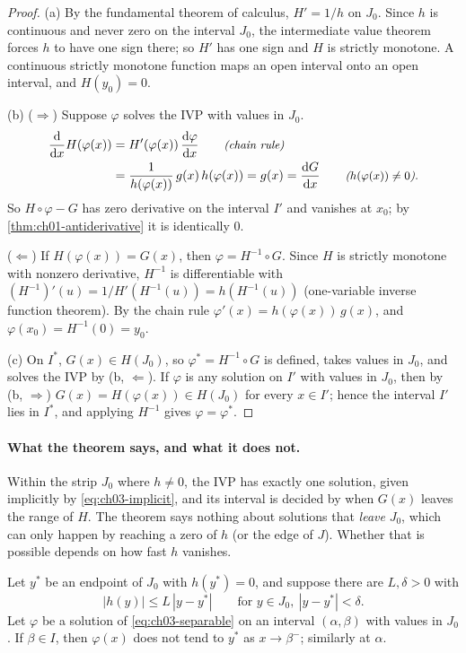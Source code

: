 \begin{proof}
(a) By the fundamental theorem of calculus, $H' = 1/h$ on $J_0$. Since $h$ is
continuous and never zero on the interval $J_0$, the intermediate value
theorem forces $h$ to have one sign there; so $H'$ has one sign and $H$ is
strictly monotone. A continuous strictly monotone function maps an open
interval onto an open interval, and $H(y_0) = 0$.

(b) ($\Rightarrow$) Suppose $\varphi$ solves the IVP with values in $J_0$.
\begin{align*}
  \frac{\mathrm{d}}{\mathrm{d}x}H(\varphi(x)) &= H'(\varphi(x))\,\frac{\mathrm{d}\varphi}{\mathrm{d}x}
     \qquad\text{\small\itshape(chain rule)}\\
  &= \frac{1}{h(\varphi(x))}\,g(x)\,h(\varphi(x)) = g(x) = \frac{\mathrm{d}G}{\mathrm{d}x}
     \qquad\text{\small\itshape($h(\varphi(x))\neq 0$)}.
\end{align*}
So $H\circ\varphi - G$ has zero derivative on the interval $I'$ and vanishes at
$x_0$; by \cref{thm:ch01-antiderivative} it is identically $0$.

($\Leftarrow$) If $H(\varphi(x)) = G(x)$, then $\varphi = H^{-1}\circ G$. Since
$H$ is strictly monotone with nonzero derivative, $H^{-1}$ is differentiable
with $(H^{-1})'(u) = 1/H'(H^{-1}(u)) = h(H^{-1}(u))$ (one-variable inverse
function theorem). By the chain rule
$\varphi'(x) = h(\varphi(x))\,g(x)$, and $\varphi(x_0) = H^{-1}(0) = y_0$.

(c) On $I^*$, $G(x)\in H(J_0)$, so $\varphi^* = H^{-1}\circ G$ is defined,
takes values in $J_0$, and solves the IVP by (b, $\Leftarrow$). If $\varphi$ is
any solution on $I'$ with values in $J_0$, then by (b, $\Rightarrow$)
$G(x) = H(\varphi(x))\in H(J_0)$ for every $x\in I'$; hence the interval
$I'$ lies in $I^*$, and applying $H^{-1}$ gives $\varphi = \varphi^*$.
\end{proof}

\paragraph{What the theorem says, and what it does not.} Within the strip
$J_0$ where $h\neq 0$, the IVP has exactly one solution, given implicitly by
\eqref{eq:ch03-implicit}, and its interval is decided by when $G(x)$ leaves the
range of $H$. The theorem says nothing about solutions that \emph{leave}
$J_0$, which can only happen by reaching a zero of $h$ (or the edge of $J$).
Whether that is possible depends on how fast $h$ vanishes.

\begin{proposition}\label{prop:ch03-lipschitz-zero}
Let $y^*$ be an endpoint of $J_0$ with $h(y^*) = 0$, and suppose there are
$L,\delta>0$ with
\[
  |h(y)|\le L\,|y - y^*|\qquad\text{for } y\in J_0,\ |y - y^*|<\delta .
\]
Let $\varphi$ be a solution of \eqref{eq:ch03-separable} on an interval
$(\alpha,\beta)$ with values in $J_0$. If $\beta\in I$, then $\varphi(x)$ does
not tend to $y^*$ as $x\to\beta^-$; similarly at $\alpha$.
\end{proposition}

